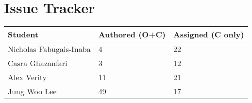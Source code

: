 \documentclass{article}
\begin{document}
\section{Issue Tracker}

\begin{table}[H]
\centering
\begin{tabular}{lll}
\toprule
\textbf{Student} & \textbf{Authored (O+C)} & \textbf{Assigned (C only)}\\
\midrule
Nicholas Fabugais-Inaba & 4 & 22 \\
Casra Ghazanfari & 3 & 12 \\
Alex Verity & 11 & 21 \\
Jung Woo Lee & 49 & 17 \\
\bottomrule
\end{tabular}
\end{table}
\end{document}
